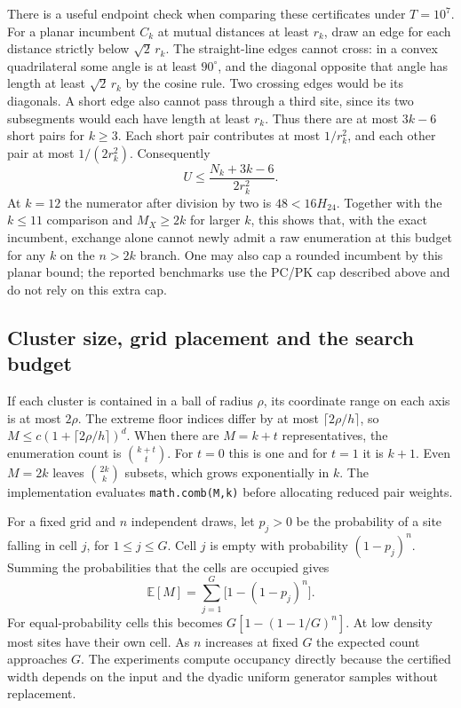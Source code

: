 \documentclass[a4paper,12pt]{article}
\numberwithin{equation}{section}
\begin{document}
There is a useful endpoint check when comparing these certificates under $T=10^7$.
For a planar incumbent $C_k$ at mutual distances at least $r_k$, draw an edge for each distance
strictly below $\sqrt2\,r_k$. The straight-line edges cannot cross: in a convex quadrilateral
some angle is at least $90^\circ$, and the diagonal opposite that angle has length at least
$\sqrt2\,r_k$ by the cosine rule. Two crossing edges would be its diagonals. A short edge also
cannot pass through a third site, since its two subsegments would each have length at least
$r_k$. Thus there are at most $3k-6$ short pairs for $k\ge3$. Each short pair contributes at
most $1/r_k^2$, and each other pair at most $1/(2r_k^2)$. Consequently
\[
 U\le \frac{N_k+3k-6}{2r_k^2}.
\]
At $k=12$ the numerator after division by two is $48<16H_{24}$. Together with the
$k\le11$ comparison and $M_X\ge2k$ for larger $k$, this shows that, with the exact incumbent,
exchange alone cannot newly admit a raw enumeration at this budget for any $k$ on the
$n>2k$ branch. One may also cap a rounded incumbent by this planar bound; the reported
benchmarks use the PC/PK cap described above and do not rely on this extra cap.

\subsection{Cluster size, grid placement and the search budget}\label{app:occupancy}

If each cluster is contained in a ball of radius $\rho$, its coordinate range on each axis is at
most $2\rho$. The extreme floor indices differ by at most $\lceil2\rho/h\rceil$, so $M\le
c(1+\lceil2\rho/h\rceil)^d$. When there are $M=k+t$ representatives, the enumeration count is
$\binom{k+t}{t}$. For $t=0$ this is one and for $t=1$ it is $k+1$. Even $M=2k$ leaves
$\binom{2k}{k}$ subsets, which grows exponentially in $k$. The implementation evaluates
\texttt{math.comb(M,k)} before allocating reduced pair weights.

For a fixed grid and $n$ independent draws, let $p_j>0$ be the probability of a site falling in
cell $j$, for $1\le j\le G$. Cell $j$ is empty with probability $(1-p_j)^n$. Summing the
probabilities that the cells are occupied gives
\[
  \mathbb E[M]=\sum_{j=1}^{G}\bigl[1-(1-p_j)^n\bigr].
\]
For equal-probability cells this becomes $G[1-(1-1/G)^n]$. At low density most sites have their
own cell. As $n$ increases at fixed $G$ the expected count approaches $G$. The experiments compute
occupancy directly because the certified width depends on the input and the dyadic uniform
generator samples without replacement.
\end{document}
